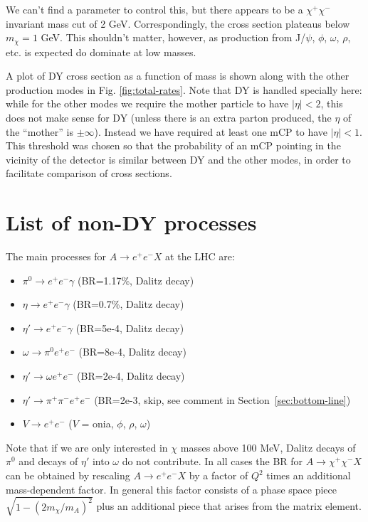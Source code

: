 \documentclass[12pt]{article}
\begin{document}
We can't find a parameter to control this, but there appears to be a $\chi^+\chi^-$ invariant
mass cut of 2 GeV. Correspondingly, the cross section plateaus below $m_\chi = 1$ GeV. This shouldn't
matter, however, as production from J/$\psi$, $\phi$, $\omega$, $\rho$, etc. is expected do dominate
at low masses.

A plot of DY cross section as a function of mass is shown along with the other production modes
in Fig. \ref{fig:total-rates}. Note that DY is handled specially here: while for the other modes
we require the mother particle to have $|\eta|<2$, this does not make sense for DY (unless there
is an extra parton produced, the $\eta$ of the ``mother'' is $\pm\infty$). Instead we have required
at least one mCP to have $|\eta|<1$. This threshold was chosen so that the probability of
an mCP pointing in the vicinity of the detector is similar between DY and the other modes, in order
to facilitate comparison of cross sections.



\section{List of non-DY processes}
\label{sec:list}

The main processes for  $A \to e^+ e^- X$ at the LHC are:
\begin{itemize}
    \item $\pi^0 \to e^+ e^- \gamma$  (BR=1.17\%, Dalitz decay)
    \item $\eta \to e^+ e^- \gamma$   (BR=0.7\%, Dalitz decay)
    \item $\eta' \to e^+ e^- \gamma$   (BR=5e-4, Dalitz decay)
    \item $\omega \to \pi^0 e^+ e^-$  (BR=8e-4, Dalitz decay)
    \item $\eta' \to \omega e^+ e^-$ (BR=2e-4, Dalitz decay)
    \item $\eta' \to \pi^+ \pi^- e^+ e^-$ (BR=2e-3, skip, see comment in Section~\ref{sec:bottom-line})
    \item $V \to e^+ e^-$ ($V$ = onia, $\phi$, $\rho$, $\omega$)
\end{itemize}

Note that if we are only interested in $\chi$ masses above 100 MeV,
Dalitz decays of $\pi^0$ and decays of $\eta'$ into $\omega$
do not contribute.
In all cases the BR for $A \to \chi^+ \chi^- X$ can be obtained
by rescaling $A \to e^+ e^- X$ by a factor of $Q^2$ times an
additional mass-dependent factor.  In general this factor consists
of a phase space piece $\sqrt{1 - (2m_\chi/m_A)^2}$ plus an additional
piece that arises from the matrix element.
\end{document}
